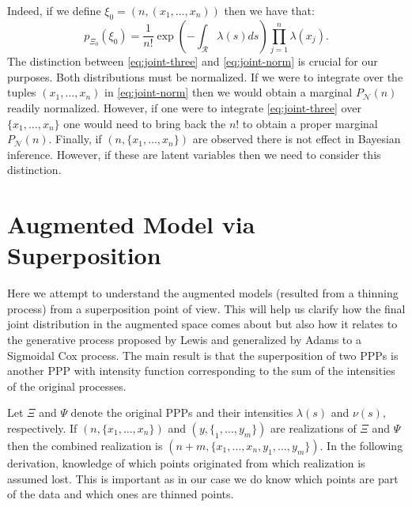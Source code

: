 \documentclass{article}
\newcommand{\calR}{\mathcal{R}}
\newcommand{\ls}{\lambda(s)}
\newcommand{\ns}{\nu(s)}
\begin{document}
	Indeed, if we define  $\xi_0 =(n, (x_1, \ldots, x_n) )$ then we have that:
	\begin{equation}
		\label{eq:joint-norm}
			p_{\Xi_0}(\xi_0) = \frac{1}{n!} \exp\left(-\int_{\calR} \ls ds\right) \prod_{j=1}^{n}  {\lambda(x_j)} \text{.}
	\end{equation}	 
	The distinction between \cref{eq:joint-three} and \cref{eq:joint-norm} is crucial for our purposes. Both distributions must be normalized. 
	If we were to integrate over the tuples $(x_1, \ldots, x_n)$ in \cref{eq:joint-norm} then we would obtain a marginal $P_{\mathcal{N}}(n)$ readily normalized. 
	However, if one were to integrate \cref{eq:joint-three} over $\{x_1, \ldots, x_n \}$ one would need to bring back the $n!$ to obtain a proper marginal $P_{\mathcal{N}}(n)$. 
	Finally, if $( n, \{x_1, \ldots, x_n \})$  are observed there is not effect in Bayesian inference.  However, if these are latent variables then we need to consider this distinction. 
		
	\section{Augmented Model via Superposition}
	Here we attempt to understand the augmented models (resulted from a thinning process) from a superposition point of view. This will help us clarify how the final joint distribution in the augmented space comes about but also how it relates to the generative process proposed by Lewis and generalized by Adams to a Sigmoidal Cox process. The main result is that the superposition of two \glspl{PPP} is another \gls{PPP} with intensity function corresponding to the sum of the intensities of the original processes.
	
	Let $\Xi$ and $\Psi$ denote the original \glspl{PPP} and their intensities $\ls$ and $\ns$, respectively. If $(n, \{x_1, \ldots, x_n\})$ and $(y, \{_1, \ldots, y_m\})$ are realizations of $\Xi$ and $\Psi$  then the combined realization is $(n + m, \{x_1, \ldots, x_n, y_1, \ldots, y_m \})$.   In the following derivation, {knowledge of which points originated from which realization is assumed lost}. This is important as in our case we do  know which points are part of the data and which ones are thinned points. 
	
\end{document}
